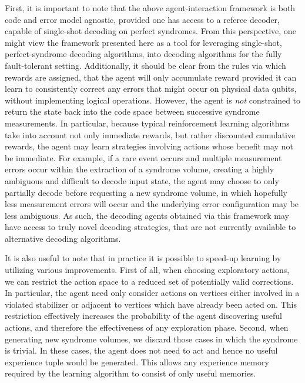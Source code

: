\documentclass[twocolumn,preprintnumbers,amsmath,amssymb,notitlepage,nofootinbib,longbibliography,superscriptaddress,aps,pra,10pt]{revtex4-1}
\begin{document}
	First, it is important to note that the above agent-interaction framework is both code and error model agnostic, provided one has access to a referee decoder, capable of single-shot decoding on perfect syndromes.
	From this perspective, one might view the framework presented here as a tool for leveraging single-shot, perfect-syndrome decoding algorithms, into decoding algorithms for the fully fault-tolerant setting.
	Additionally, it should be clear from the rules via which rewards are assigned, that the agent will only accumulate reward provided it can learn to consistently correct any errors that might occur on physical data qubits, without implementing logical operations.
	However, the agent is \textit{not} constrained to return the state back into the code space between successive syndrome measurements.
	In particular, because typical reinforcement learning algorithms take into account not only immediate rewards, but rather discounted cumulative rewards, the agent may learn strategies involving actions whose benefit may not be immediate.
	For example, if a rare event occurs and multiple measurement errors occur within the extraction of a syndrome volume, creating a highly ambiguous and difficult to decode input state, the agent may choose to only partially decode before requesting a new syndrome volume, in which hopefully less measurement errors will occur and the underlying error configuration may be less ambiguous.
	As such, the decoding agents obtained via this framework may have access to truly novel decoding strategies, that are not currently available to alternative decoding algorithms.

	It is also useful to note that in practice it is possible to speed-up learning by utilizing various improvements.
	First of all, when choosing exploratory actions, we can restrict the action space to a reduced set of potentially valid corrections.
	In particular, the agent need only consider actions on vertices either involved in a violated stabilizer or adjacent to vertices which have already been acted on.
	This restriction effectively increases the probability of the agent discovering useful actions, and therefore the effectiveness of any exploration phase.
	Second, when generating new syndrome volumes, we discard those cases in which the syndrome is trivial.
	In these cases, the agent does not need to act and hence no useful experience tuple would be generated.
	This allows any experience memory required by the learning algorithm to consist of only useful memories.
\end{document}
